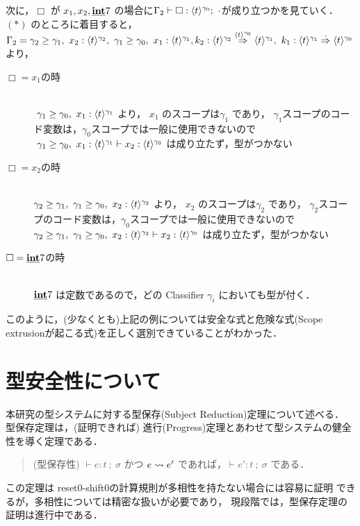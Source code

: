 次に，$\Box$ が $x_1, x_2, \underline{\textbf{int}} 7$ の場合に$\Gamma_2 \vdash \Box : \langle{t}\rangle^{\gamma_0};~ \cdot$が成り立つかを見ていく．\\
$(*)$ のところに着目すると，
$\Gamma_2 = {\gamma_2} \ge {\gamma_1},~x_2:\langle{t}\rangle^{\gamma_2},~{\gamma_1} \ge {\gamma_0},~x_1:\langle{t}\rangle^{\gamma_1},k_2:{\langle{t}\rangle^{\gamma_2}} \stackrel{\langle{t}\rangle^{\gamma_0}}{\Rightarrow} {\langle{t}\rangle^{\gamma_1}},~k_1:{\langle{t}\rangle^{\gamma_1}} \stackrel{\cdot{}}{\Rightarrow} {\langle{t}\rangle^{\gamma_0}}$
より，
\begin{description}
\item[$\Box=x_1$の時]\mbox{}\\
  $~{\gamma_1} \ge {\gamma_0},~x_1:\langle{t}\rangle^{\gamma_1}$ より，
  $x_1$ のスコープは$\gamma_1$ であり，
  $\gamma_1$スコープのコード変数は，$\gamma_0$スコープでは一般に使用できないので
  $~{\gamma_1} \ge {\gamma_0},~x_1:\langle{t}\rangle^{\gamma_1} \vdash x_2:\langle{t}\rangle^{\gamma_0}$ は成り立たず，型がつかない
\item[$\Box=x_2$の時]\mbox{}\\
  ${\gamma_2} \ge {\gamma_1},~{\gamma_1} \ge {\gamma_0},~x_2:\langle{t}\rangle^{\gamma_2}$ より，
  $x_2$ のスコープは$\gamma_2$ であり，
  $\gamma_2$スコープのコード変数は，$\gamma_0$スコープでは一般に使用できないので
  ${\gamma_2} \ge {\gamma_1},~{\gamma_1} \ge {\gamma_0},~x_2:\langle{t}\rangle^{\gamma_2} \vdash x_2:\langle{t}\rangle^{\gamma_0}$ は成り立たず，型がつかない
\item[$\Box= \underline{\textbf{int}} 7$の時]\mbox{}\\
  $\underline{\textbf{int}} 7$ は定数であるので，どの Classifier $\gamma_i$ においても型が付く．
\end{description}

このように，(少なくとも)上記の例については安全な式と危険な式(Scope extrusionが起こる式)を正しく選別できていることがわかった．

\section{型安全性について}

本研究の型システムに対する型保存(Subject Reduction)定理について述べる．
型保存定理は，(証明できれば)
進行(Progress)定理とあわせて型システムの健全性を導く定理である．

\begin{quote}
  (型保存性)
  $\vdash e:t~;~\sigma$ かつ $e \leadsto e'$ であれば，$\vdash e':t~;~\sigma$
  である．
\end{quote}

この定理は reset0-shift0の計算規則が多相性を持たない場合には容易に証明
できるが，多相性については精密な扱いが必要であり，
現段階では，型保存定理の証明は進行中である．


